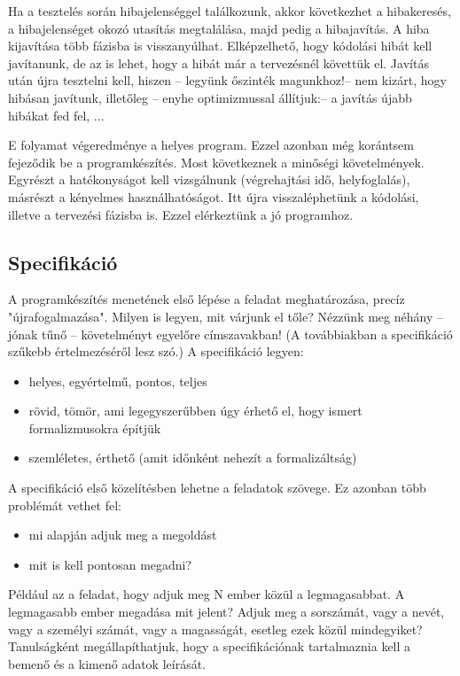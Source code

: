 \documentclass[margin=0px]{article}
\begin{document}
	Ha a tesztelés során hibajelenséggel találkozunk, akkor következhet a hibakeresés, a hibajelenséget okozó utasítás megtalálása, majd pedig a hibajavítás. A hiba kijavítása több fázisba is visszanyúlhat. Elképzelhető, hogy kódolási hibát kell javítanunk, de az is lehet, hogy a hibát már a tervezésnél követtük el. Javítás után újra tesztelni kell, hiszen – legyünk őszinték magunkhoz!– nem kizárt, hogy hibásan javítunk, illetőleg – enyhe optimizmussal állítjuk:– a javítás újabb hibákat fed fel, ...
	
	E folyamat végeredménye a helyes program. Ezzel azonban még korántsem fejeződik be a programkészítés. Most következnek a minőségi követelmények. Egyrészt a hatékonyságot kell vizsgálnunk (végrehajtási idő, helyfoglalás), másrészt a kényelmes használhatóságot. Itt újra visszaléphetünk a kódolási, illetve a tervezési fázisba is. Ezzel elérkeztünk a jó programhoz.
	
	\subsection{Specifikáció}
	A programkészítés menetének első lépése a feladat meghatározása, precíz "újrafogalmazása". Milyen is legyen, mit várjunk el tőle? Nézzünk meg néhány – jónak tűnő – követelményt egyelőre címszavakban! (A továbbiakban a specifikáció szűkebb értelmezéséről lesz szó.) A specifikáció legyen:

	\begin{itemize}
		\item helyes, egyértelmű, pontos, teljes
		\item rövid, tömör, ami legegyszerűbben úgy érhető el, hogy ismert formalizmusokra építjük
		\item szemléletes, érthető (amit időnként nehezít a formalizáltság) 
	\end{itemize}
	
	A specifikáció első közelítésben lehetne a feladatok szövege. Ez azonban több problémát vethet fel:
	
	\begin{itemize}
		\item mi alapján adjuk meg a megoldást
		\item mit is kell pontosan megadni?
	\end{itemize}
	
	Például az a feladat, hogy adjuk meg N ember közül a legmagasabbat. A legmagasabb ember megadása mit jelent? Adjuk meg a sorszámát, vagy a nevét, vagy a személyi számát, vagy a magasságát, esetleg ezek közül mindegyiket?
	Tanulságként megállapíthatjuk, hogy a specifikációnak tartalmaznia kell a bemenő és a kimenő adatok leírását.
	
\end{document}
